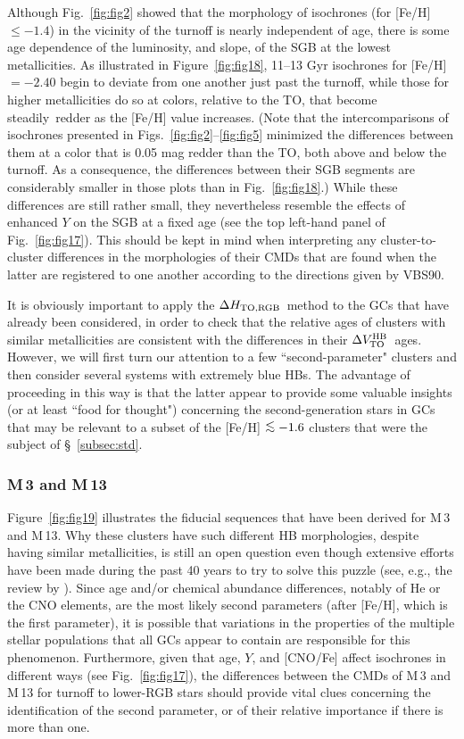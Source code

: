 \documentclass[12pt,preprint]{aastex}
\newcommand\delv{\Delta V^{\rm HB}_{\rm TO}}
\newcommand\delc{\Delta H_{\rm TO,RGB}}
\newcommand\lta{\mathrel{\hbox{\raise 0.6 ex \hbox{$<$}\kern
                   -1.8 ex\lower .5 ex\hbox{$\sim$}}}}
\begin{document}
Although Fig.~\ref{fig:fig2} showed that the morphology of isochrones (for
[Fe/H] $\le -1.4$) in the vicinity of the turnoff is nearly independent of age,
there is some age dependence of the luminosity, and slope, of the SGB at the
lowest metallicities.  As illustrated in Figure~\ref{fig:fig18}, 11--13 Gyr
isochrones for [Fe/H] $= -2.40$ begin to deviate from one another just past the
turnoff, while those for higher metallicities do so at colors, relative to the
TO, that become steadily\ redder as the [Fe/H] value increases.   (Note that
the intercomparisons of isochrones presented in
Figs.~\ref{fig:fig2}--\ref{fig:fig5} minimized the
differences between them at a color that is 0.05 mag redder than the TO, both
above and below the turnoff.  As a consequence, the differences between their
SGB segments are considerably smaller in those plots than in 
Fig.~\ref{fig:fig18}.)  While these differences are still rather small, they
nevertheless resemble the effects of enhanced $Y$ on the SGB at a fixed age
(see the top left-hand panel of Fig.~\ref{fig:fig17}).  This should be kept in
mind when interpreting any cluster-to-cluster differences in the morphologies
of their CMDs that are found when the latter are registered to one another
according to the directions given by VBS90.

It is obviously important to apply the $\delc$\ method to the GCs that have
already been considered, in order to check that the relative ages of clusters
with similar metallicities are consistent with the differences in their
$\delv$\ ages.  However, we will first turn our attention to a few
``second-parameter" clusters and then consider several systems with extremely
blue HBs.  The advantage of proceeding in this way is that the latter appear to
provide some valuable insights (or at least ``food for thought") concerning the
second-generation stars in GCs that may be relevant to a subset of the [Fe/H]
$\lta -1.6$ clusters that were the subject of \S~\ref{subsec:std}.

\subsubsection{M$\,$3 and M$\,$13}
\label{subsubsec:m3m13}

Figure~\ref{fig:fig19} illustrates the fiducial sequences that have been
derived for M$\,$3 and M$\,$13.  Why these clusters have such different HB
morphologies, despite having similar metallicities, is still an open question
even though extensive efforts have been made during the past 40 years to try to
solve this puzzle (see, e.g., the review by \citealt{cat09}).  Since age and/or
chemical abundance differences, notably of He or the CNO elements, are the most
likely second parameters (after [Fe/H], which is the first parameter), it is
possible that variations in the properties of the multiple stellar populations
that all GCs appear to contain are responsible for this phenomenon. Furthermore,
given that age, $Y$, and [CNO/Fe] affect isochrones in different ways (see
Fig.~\ref{fig:fig17}), the differences between the CMDs of M$\,$3 and M$\,$13
for turnoff to lower-RGB stars should provide vital clues concerning the
identification of the second parameter, or of their relative importance if
there is more than one.
\end{document}
